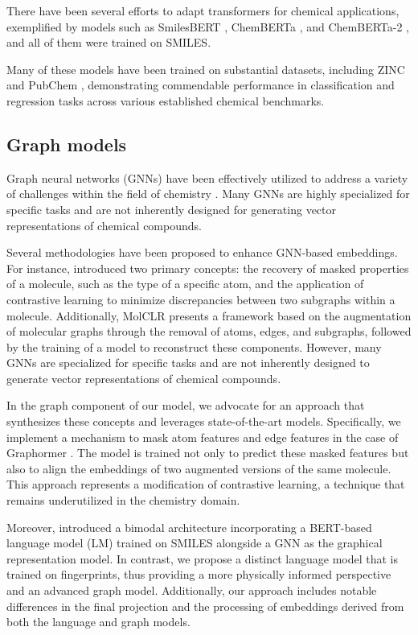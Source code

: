 There have been several efforts to adapt transformers for chemical applications, exemplified by models such as SmilesBERT \citep{10.1145/3307339.3342186}, ChemBERTa \citep{ChemBERTa-1}, and ChemBERTa-2 \citep{ChemBERTa-2}, and all of them were trained on SMILES.

Many of these models have been trained on substantial datasets, including ZINC \citep{doi:10.1021/ci3001277} and PubChem \citep{pubchem}, demonstrating commendable performance in classification and regression tasks across various established chemical benchmarks.

\subsection{Graph models}

Graph neural networks (GNNs) have been effectively utilized to address a variety of challenges within the field of chemistry \citep{graph1, graph2}. Many GNNs are highly specialized for specific tasks and are not inherently designed for generating vector representations of chemical compounds.

Several methodologies have been proposed to enhance GNN-based embeddings. For instance, \citep{compexp} introduced two primary concepts: the recovery of masked properties of a molecule, such as the type of a specific atom, and the application of contrastive learning to minimize discrepancies between two subgraphs within a molecule. Additionally, MolCLR \citep{molclr} presents a framework based on the augmentation of molecular graphs through the removal of atoms, edges, and subgraphs, followed by the training of a model to reconstruct these components. However, many GNNs are specialized for specific tasks and are not inherently designed to generate vector representations of chemical compounds. 

In the graph component of our model, we advocate for an approach that synthesizes these concepts and leverages state-of-the-art models. Specifically, we implement a mechanism to mask atom features and edge features in the case of Graphormer \citep{graphormer}. The model is trained not only to predict these masked features but also to align the embeddings of two augmented versions of the same molecule. This approach represents a modification of contrastive learning, a technique that remains underutilized in the chemistry domain.

Moreover, \citep{dual} introduced a bimodal architecture incorporating a BERT-based language model (LM) trained on SMILES alongside a GNN as the graphical representation model. In contrast, we propose a distinct language model that is trained on fingerprints, thus providing a more physically informed perspective and an advanced graph model. Additionally, our approach includes notable differences in the final projection and the processing of embeddings derived from both the language and graph models.